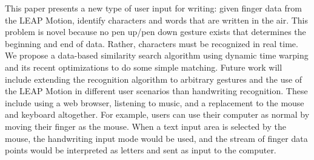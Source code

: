 This paper presents a new type of user input for writing: given finger data from the LEAP Motion, identify characters and words that are written in the air. This problem is novel because no pen up/pen down gesture exists that determines the beginning and end of data. Rather, characters must be recognized in real time. We propose a data-based similarity search algorithm using dynamic time warping and its recent optimizations to do some simple matching. Future work will include extending the recognition algorithm to arbitrary gestures and the use of the LEAP Motion in different user scenarios than handwriting recognition. These include using a web browser, listening to music, and a replacement to the mouse and keyboard altogether. For example, users can use their computer as normal by moving their finger as the mouse. When a text input area is selected by the mouse, the handwriting input mode would be used, and the stream of finger data points would be interpreted as letters and sent as input to the computer.\\
